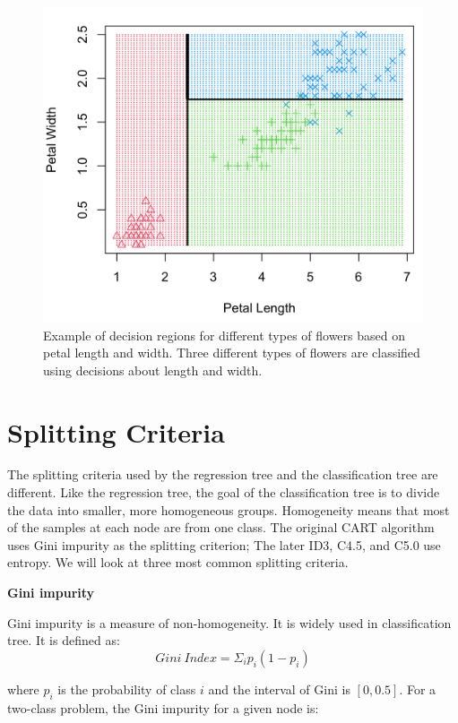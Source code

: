 \documentclass[12pt,]{krantz}
\begin{document}
\begin{figure}

{\centering \includegraphics[width=0.8\linewidth]{images/decisionregion} 

}

\caption{Example of decision regions for different types of flowers based on petal length and width. Three different types of flowers are classified using decisions about length and width.}\label{fig:decisionregion}
\end{figure}

\hypertarget{splitting-criteria}{%
\section{Splitting Criteria}\label{splitting-criteria}}

The splitting criteria used by the regression tree and the classification tree are different. Like the regression tree, the goal of the classification tree is to divide the data into smaller, more homogeneous groups. Homogeneity means that most of the samples at each node are from one class. The original CART algorithm uses Gini impurity as the splitting criterion; The later ID3, C4.5, and C5.0 use entropy. We will look at three most common splitting criteria.

\textbf{Gini impurity}

Gini impurity \citep{Breiman1984} is a measure of non-homogeneity. It is widely used in classification tree. It is defined as:
\[Gini\ Index = \Sigma_i p_i(1-p_i)\]

where \(p_i\) is the probability of class \(i\) and the interval of Gini is \([0, 0.5]\). For a two-class problem, the Gini impurity for a given node is:
\end{document}
